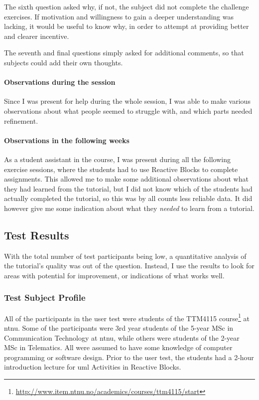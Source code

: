 \noindent
The sixth question asked why, if not, the subject did not complete the challenge exercises. If motivation and willingness to gain a deeper understanding was lacking, it would be useful to know why, in order to attempt at providing better and clearer incentive.

\noindent
The seventh and final questions simply asked for additional comments, so that subjects could add their own thoughts.

\paragraph{Observations during the session} Since I was present for help during the whole session, I was able to make various observations about what people seemed to struggle with, and which parts needed refinement.

\paragraph{Observations in the following weeks} As a student assistant in the course, I was present during all the following exercise sessions, where the students had to use Reactive Blocks to complete assignments. This allowed me to make some additional observations about what they had learned from the tutorial, but I did not know which of the students had actually completed the tutorial, so this was by all counts less reliable data. It did however give me some indication about what they \emph{needed} to learn from a tutorial.

\subsection{Test Results}
\label{sec:tutorial_test_results}
With the total number of test participants being low, a quantitative analysis of the tutorial's quality was out of the question. Instead, I use the results to look for areas with potential for improvement, or indications of what works well.

\subsubsection{Test Subject Profile}
All of the participants in the user test were students of the TTM4115 course\footnote{\url{http://www.item.ntnu.no/academics/courses/ttm4115/start}} at \gls{ntnu}. Some of the participants were 3rd year students of the 5-year MSc in Communication Technology at \gls{ntnu}, while others were students of the 2-year MSc in Telematics. All were assumed to have some knowledge of computer programming or software design. Prior to the user test, the students had a 2-hour introduction lecture for \gls{uml} Activities in Reactive Blocks.

